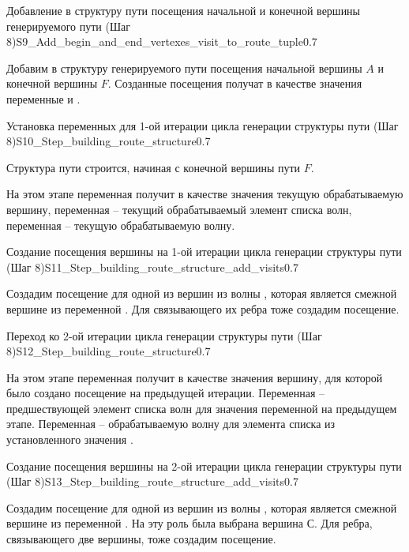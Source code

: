\begin{algostep}{Добавление в структуру пути посещения начальной и
    конечной вершины генерируемого пути (Шаг
    8)}{S9_Add_begin_and_end_vertexes_visit_to_route_tuple}{0.7}
 
  Добавим в структуру генерируемого пути посещения начальной вершины
  $A$ и конечной вершины $F$. Созданные посещения получат в качестве
  значения переменные  и
  .
\end{algostep}


\begin{algostep}{Установка переменных для 1-ой итерации цикла генерации
    структуры пути (Шаг 8)}{S10_Step_building_route_structure}{0.7}
  
  Структура пути строится, начиная с конечной вершины пути $F$.

  На этом этапе переменная  получит в качестве
  значения текущую обрабатываемую вершину, переменная 
  – текущий обрабатываемый элемент списка волн, переменная
   – текущую обрабатываемую волну.
\end{algostep}


\begin{algostep}{Создание посещения вершины на 1-ой итерации цикла
    генерации структуры пути (Шаг
    8)}{S11_Step_building_route_structure_add_visits}{0.7}
 
  Создадим посещение для одной из вершин из волны ,
  которая является смежной вершине из переменной
  . Для связывающего их ребра тоже создадим
  посещение.
\end{algostep}  


\begin{algostep}{Переход ко 2-ой итерации цикла генерации структуры
    пути (Шаг 8)}{S12_Step_building_route_structure}{0.7}
 
  На этом этапе переменная  получит в качестве
  значения вершину, для которой было создано посещение на предыдущей
  итерации. Переменная  – предшествующей элемент
  списка волн для значения переменной  на предыдущем
  этапе. Переменная  – обрабатываемую волну для
  элемента списка из установленного значения .
\end{algostep}


\begin{algostep}{Создание посещения вершины на 2-ой итерации цикла
    генерации структуры пути (Шаг
    8)}{S13_Step_building_route_structure_add_visits}{0.7}

  Создадим посещение для одной из вершин из волны ,
  которая является смежной вершине из переменной
  . На эту роль была выбрана вершина $С$. Для
  ребра, связывающего две вершины, тоже создадим посещение.
\end{algostep}



